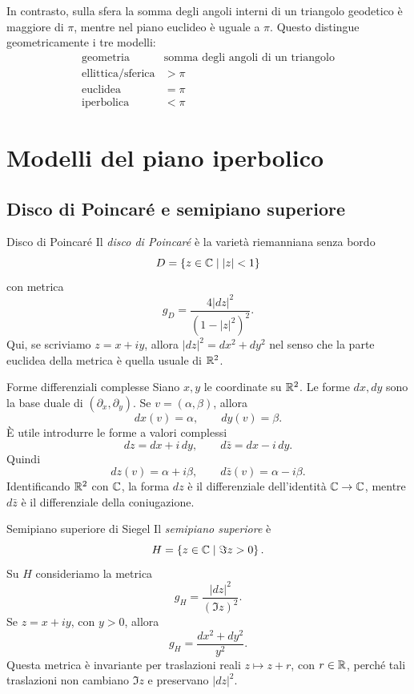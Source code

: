 \documentclass[a4paper]{article}
\begin{document}
In contrasto, sulla sfera la somma degli angoli interni di un triangolo geodetico è maggiore di \(\pi\), mentre nel piano euclideo è uguale a \(\pi\). Questo distingue geometricamente i tre modelli:
\[
    \begin{array}{c|c}
        \text{geometria} & \text{somma degli angoli di un triangolo}\\
        \hline
        \text{ellittica/sferica} & >\pi\\
        \text{euclidea} & =\pi\\
        \text{iperbolica} & <\pi
    \end{array}
\]

\section{Modelli del piano iperbolico}

\subsection{Disco di Poincaré e semipiano superiore}

\begin{snippetdefinition}{Disco di Poincaré}
Il \emph{disco di Poincaré} è la varietà riemanniana senza bordo
\[
    D = \left\{z\in\mathbb{C} \mid |z|<1\right\}
\]
con metrica
\[
    g_D = \frac{4|dz|^2}{\left(1-|z|^2\right)^2}.
\]
Qui, se scriviamo \(z=x+iy\), allora \(|dz|^2=dx^2+dy^2\) nel senso che la parte euclidea della metrica è quella usuale di \(\mathbb{R}^2\).
\end{snippetdefinition}

\begin{snippetdefinition}{Forme differenziali complesse}
Siano \(x,y\) le coordinate su \(\mathbb{R}^2\). Le forme \(dx,dy\) sono la base duale di \((\partial_x,\partial_y)\). Se \(v=(\alpha,\beta)\), allora
\[
    dx(v)=\alpha, \qquad dy(v)=\beta.
\]
È utile introdurre le forme a valori complessi
\[
    dz = dx+i\,dy, \qquad d\bar z = dx-i\,dy.
\]
Quindi
\[
    dz(v)=\alpha+i\beta, \qquad d\bar z(v)=\alpha-i\beta.
\]
Identificando \(\mathbb{R}^2\) con \(\mathbb{C}\), la forma \(dz\) è il differenziale dell'identità \(\mathbb{C}\to\mathbb{C}\), mentre \(d\bar z\) è il differenziale della coniugazione.
\end{snippetdefinition}

\begin{snippetdefinition}{Semipiano superiore di Siegel}
Il \emph{semipiano superiore} è
\[
    H=\left\{z\in\mathbb{C} \mid \Im z>0\right\}.
\]
Su \(H\) consideriamo la metrica
\[
    g_H = \frac{|dz|^2}{(\Im z)^2}.
\]
Se \(z=x+iy\), con \(y>0\), allora
\[
    g_H = \frac{dx^2+dy^2}{y^2}.
\]
Questa metrica è invariante per traslazioni reali \(z\mapsto z+r\), con \(r\in\mathbb{R}\), perché tali traslazioni non cambiano \(\Im z\) e preservano \(|dz|^2\).
\end{snippetdefinition}
\end{document}
